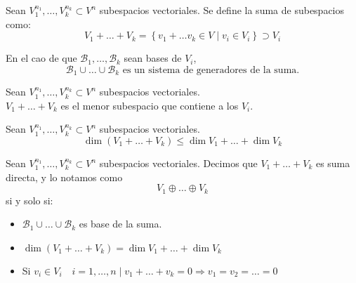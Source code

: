 \begin{definicion}
    Sean $V_1^{n_1}, \dots,V_k^{n_k} \subset V^n$ subespacios vectoriales. Se define la suma de subespacios como:
    $$V_1+\dots +V_k = \left\{ v_1 + \dots v_k \in V \mid v_i \in V_i \right\} \supset V_i$$

    En el cao de que $\mathcal{B}_1,\dots,\mathcal{B}_k$ sean bases de $V_i$,
    $$\mathcal{B}_1\cup \dots \cup \mathcal{B}_k \text{ es un sistema de generadores de la suma.}$$
\end{definicion}
\begin{prop}
    Sean $V_1^{n_1}, \dots,V_k^{n_k} \subset V^n$ subespacios vectoriales.\\
    $V_1+\dots +V_k$ es el menor subespacio que contiene a los $V_i$.
\end{prop}
\begin{prop} Sean $V_1^{n_1}, \dots,V_k^{n_k} \subset V^n$ subespacios vectoriales.
    \begin{equation*}
        \dim (V_1 + \dots + V_k) \leq \dim V_1 + \dots + \dim V_k
    \end{equation*}
\end{prop}

\begin{definicion} Sean $V_1^{n_1}, \dots,V_k^{n_k} \subset V^n$ subespacios vectoriales.
    Decimos que $V_1 + \dots + V_k$ es suma directa, y lo notamos como $$V_1 \oplus \dots \oplus V_k$$ si y solo si:
    \begin{itemize}
        \item $\mathcal{B}_1\cup \dots \cup \mathcal{B}_k$ es base de la suma.

        \item $\dim (V_1 + \dots + V_k) = \dim V_1 + \dots + \dim V_k$

        \item Si $v_i\in V_i \quad i=1,\dots,n \mid v_1+\dots + v_k = 0 \Longrightarrow v_1=v_2=\dots=0$
    \end{itemize}
\end{definicion}


